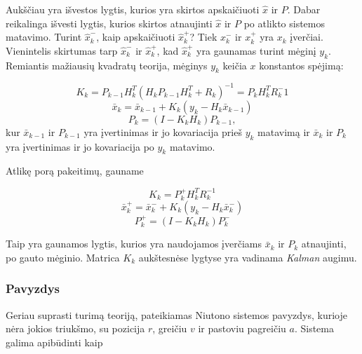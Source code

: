     Aukščiau yra išvestos lygtis, kurios yra skirtos apskaičiuoti $\hat{x}$ ir $P$.
    Dabar reikalinga išvesti lygtis, kurios skirtos atnaujinti $\hat{x}$ ir $P$ po atlikto sistemos matavimo.
    Turint $\hat{x}_k^-$, kaip apskaičiuoti $\hat{x}_k^+$? Tiek $x_k^-$ ir $x_k^+$ yra $x_k$ įverčiai.
    Vienintelis skirtumas tarp $\hat{x}_k^-$ ir $\hat{x}_k^+$, kad $\hat{x}_k^+$ yra gaunamas turint mėginį $y_k$.
    Remiantis mažiausių kvadratų teorija, mėginys $y_k$ keičia $x$ konstantos spėjimą:

    \begin{equation}
        K_k = P_{k-1}H_k^T(H_kP_{k-1}H_k^T + R_k)^{-1} = P_kH_k^TR_k^-1
    \end{equation}
    \begin{equation}
        \bar{x}_k = \bar{x}_{k-1} + K_k(y_k - H_k\bar{x}_{k-1})
    \end{equation}
    \begin{equation}
        P_k = (I - K_kH_k)P_{k-1},
    \end{equation}
    kur $\bar{x}_{k-1}$ ir $P_{k-1}$ yra įvertinimas ir jo kovariacija prieš $y_k$ matavimą ir $\bar{x}_k$ ir $P_k$ yra įvertinimas ir jo kovariacija po $y_k$ matavimo.

    Atlikę porą pakeitimų, gauname

    \begin{equation}
        K_k = P_{k}^+H_k^TR_k^{-1}
    \end{equation}
    \begin{equation}
        \bar{x}_k^+ = \bar{x}_k^- + K_k(y_k - H_k\bar{x}_k^-)
    \end{equation}
    \begin{equation}
        P_k^+ = (I-K_kH_k)P_{k}^-
    \end{equation}

    Taip yra gaunamos lygtis, kurios yra naudojamos įverčiams $\bar{x}_k$ ir $P_k$ atnaujinti, po gauto mėginio.
    Matrica $K_k$ aukštesnėse lygtyse yra vadinama \textit{Kalman} augimu.

    \subsubsection{Pavyzdys}

    Geriau suprasti turimą teoriją, pateikiamas Niutono sistemos pavyzdys, kurioje nėra jokios triukšmo, su pozicija $r$, greičiu $v$ ir pastoviu pagreičiu $a$.
    Sistema galima apibūdinti kaip

